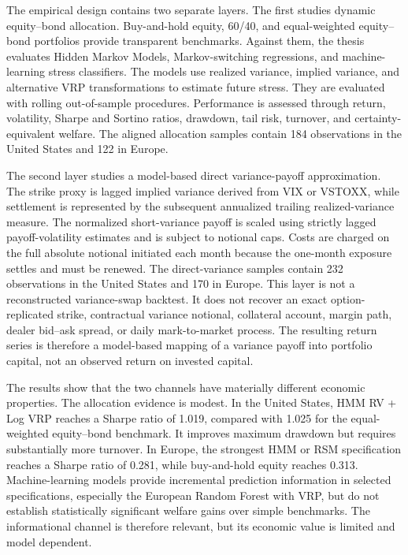 The empirical design contains two separate layers. The first studies dynamic equity--bond allocation. Buy-and-hold equity, 60/40, and equal-weighted equity--bond portfolios provide transparent benchmarks. Against them, the thesis evaluates Hidden Markov Models, Markov-switching regressions, and machine-learning stress classifiers. The models use realized variance, implied variance, and alternative VRP transformations to estimate future stress. They are evaluated with rolling out-of-sample procedures. Performance is assessed through return, volatility, Sharpe and Sortino ratios, drawdown, tail risk, turnover, and certainty-equivalent welfare. The aligned allocation samples contain 184 observations in the United States and 122 in Europe.

The second layer studies a model-based direct variance-payoff approximation. The strike proxy is lagged implied variance derived from VIX or VSTOXX, while settlement is represented by the subsequent annualized trailing realized-variance measure. The normalized short-variance payoff is scaled using strictly lagged payoff-volatility estimates and is subject to notional caps. Costs are charged on the full absolute notional initiated each month because the one-month exposure settles and must be renewed. The direct-variance samples contain 232 observations in the United States and 170 in Europe. This layer is not a reconstructed variance-swap backtest. It does not recover an exact option-replicated strike, contractual variance notional, collateral account, margin path, dealer bid--ask spread, or daily mark-to-market process. The resulting return series is therefore a model-based mapping of a variance payoff into portfolio capital, not an observed return on invested capital.

The results show that the two channels have materially different economic properties. The allocation evidence is modest. In the United States, HMM RV + Log VRP reaches a Sharpe ratio of 1.019, compared with 1.025 for the equal-weighted equity--bond benchmark. It improves maximum drawdown but requires substantially more turnover. In Europe, the strongest HMM or RSM specification reaches a Sharpe ratio of 0.281, while buy-and-hold equity reaches 0.313. Machine-learning models provide incremental prediction information in selected specifications, especially the European Random Forest with VRP, but do not establish statistically significant welfare gains over simple benchmarks. The informational channel is therefore relevant, but its economic value is limited and model dependent.

